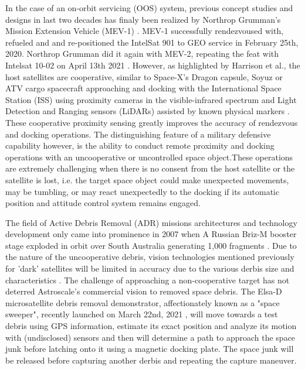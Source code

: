 In the case of an on-orbit servicing (OOS) system, previous concept studies and designs in last two decades \cite{tatschOss06,floresabadReviewSpaceRobotics20141} has finaly been realized by Northrop Grumman's Mission Extension Vehicle (MEV-1) \cite{mev121}. MEV-1 successfully rendezvoused with, refueled and and re-positioned the IntelSat 901 to GEO service in February 25th, 2020.  Northrop Grumman did it again with MEV-2, repeating the feat with Intelsat 10-02 on April 13th 2021 \footnotemark[8]{}. However, as highlighted by Harrison et al.\cite{darkArts21}, the host satellites are cooperative, similar to Space-X's Dragon capsule, Soyuz or ATV cargo spacecraft approaching and docking with the International Space Station (ISS) using proximity cameras in the visible-infrared spectrum and Light Detection and Ranging sensors (LiDARs) assisted by known physical markers \cite{OpromollaPose17}. These cooperative proximity sensing greatly improves the accuracy of rendezvous and docking operations. The distinguishing feature of a military defensive capability however, is the ability to conduct remote proximity and docking operations with an uncooperative or uncontrolled space object.These operations are extremely challenging when there is no consent from the host satellite or the satellite is lost, i.e. the target space object could make unexpected movements, may be tumbling, or may react unexpectedly to the docking if its automatic position and attitude control system remains engaged. 


The field of Active Debris Removal (ADR) missions architectures and technology development only came into prominence in 2007 when A Russian Briz-M booster stage exploded in orbit over South Australia generating 1,000 fragments \cite{bonnalAdr13}. Due to the nature of the uncooperative debris, vision technologies mentioned previously for 'dark' satellites will be limited in accuracy due to the various derbis size and characteristics \cite{limAdrVision13}.  The challenge of approaching a non-cooperative target has not deterred Astroscale's commercial vision to removed space debris. The Elsa-D microsatellite debris removal demonstrator, affectionately known as a "space sweeper", recently launched on March 22nd, 2021 \footnotemark[9]{}, will move towards a test debris using GPS information, estimate its exact position and analyze its motion with (undisclosed) sensors and then will determine a path to approach the space junk before latching onto it using a magnetic docking plate. The space junk will be released before capturing another derbis and repeating the capture maneuver\cite{elsaD19}.

